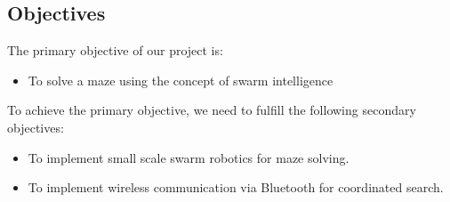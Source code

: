 \subsection{Objectives}
The primary objective of our project is:
\begin{itemize}
\item To solve a maze  using the concept of swarm intelligence 
\end{itemize}
\justify To  achieve the primary objective, we need to fulfill the following secondary objectives:
\begin{itemize}
\item To implement small scale swarm robotics for maze solving.
\item  To implement wireless communication via Bluetooth for coordinated search.
\end{itemize}
 


